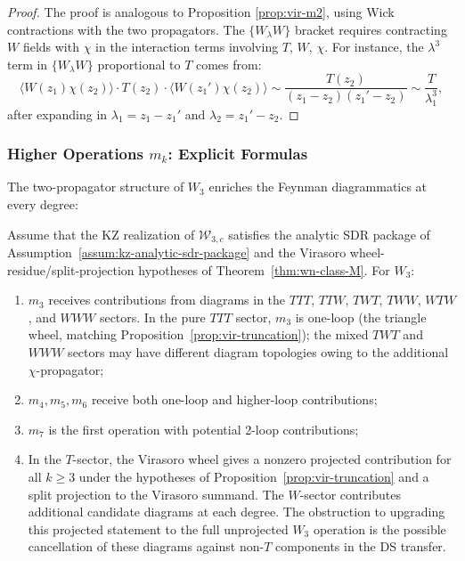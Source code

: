 \begin{proof}
The proof is analogous to Proposition \ref{prop:vir-m2}, using Wick contractions with the two propagators. The $\{W_\lambda W\}$ bracket requires contracting $W$ fields with $\chi$ in the interaction terms involving $T$, $W$, $\chi$. For instance, the $\lambda^3$ term in $\{W_\lambda W\}$ proportional to $T$ comes from:
\[
\langle W(z_1) \chi(z_2) \rangle \cdot T(z_2) \cdot \langle W(z_1') \chi(z_2) \rangle \sim \frac{T(z_2)}{(z_1-z_2)(z_1'-z_2)} \sim \frac{T}{\lambda_1^3},
\]
after expanding in $\lambda_1 = z_1 - z_1'$ and $\lambda_2 = z_1' - z_2$.
\end{proof}

\subsubsection{Higher Operations $m_k$: Explicit Formulas}

The two-propagator structure of $W_3$ enriches the Feynman diagrammatics at every degree:

\begin{proposition}
\label{prop:w3-structure}
Assume that the KZ realization of $\mathcal W_{3,c}$ satisfies the
analytic SDR package of Assumption~\ref{assum:kz-analytic-sdr-package}
and the Virasoro wheel-residue/split-projection hypotheses of
Theorem~\ref{thm:wn-class-M}.
For $W_3$:
\begin{enumerate}
\item $m_3$ receives contributions from diagrams in the $TTT$, $TTW$, $TWT$, $TWW$, $WTW$, and $WWW$ sectors. In the pure $TTT$ sector, $m_3$ is one-loop (the triangle wheel, matching Proposition~\ref{prop:vir-truncation}); the mixed $TWT$ and $WWW$ sectors may have different diagram topologies owing to the additional $\chi$-propagator;
\item $m_4, m_5, m_6$ receive both one-loop and higher-loop contributions;
\item $m_7$ is the first operation with potential 2-loop contributions;
\item In the $T$-sector, the Virasoro wheel gives a nonzero
projected contribution for all $k \geq 3$ under the hypotheses of
Proposition~\ref{prop:vir-truncation} and a split projection to the
Virasoro summand. The $W$-sector contributes additional candidate
diagrams at each degree.  The obstruction to upgrading this projected
statement to the full unprojected $W_3$ operation is the possible
cancellation of these diagrams against non-$T$ components in the
DS transfer.
\end{enumerate}
\end{proposition}

